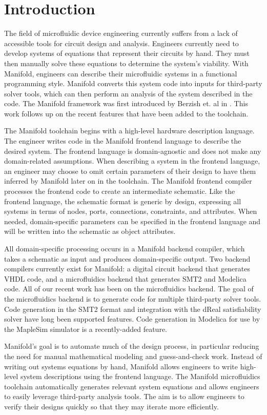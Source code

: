 \section{Introduction}

The field of microfluidic device engineering currently suffers from a lack of accessible tools for circuit design and analysis.
Engineers currently need to develop systems of equations that represent their circuits by hand.\cite{Thorsen02science}
They must then manually solve these equations to determine the system's viability.
With Manifold, engineers can describe their microfluidic systems in a functional programming style. 
Manifold converts this system code into inputs for third-party solver tools, which can then perform an analysis of the system described in the code.
The Manifold framework was first introduced by Berzish et. al in \cite{Berzish16cascon}.
This work follows up on the recent features that have been added to the toolchain.

The Manifold toolchain begins with a high-level hardware description language.
The engineer writes code in the Manifold frontend language to describe the desired system.
The frontend language is domain-agnostic and does not make any domain-related assumptions.
When describing a system in the frontend language, an engineer may choose to omit certain parameters of their design to have them inferred by Manifold later on in the toolchain.
The Manifold frontend compiler processes the frontend code to create an intermediate schematic.
Like the frontend language, the schematic format is generic by design, expressing all systems in terms of nodes, ports, connections, constraints, and attributes.
When needed, domain-specific parameters can be specified in the frontend language and will be written into the schematic as object attributes.

All domain-specific processing occurs in a Manifold backend compiler, which takes a schematic as input and produces domain-specific output.
Two backend compilers currently exist for Manifold: a digital circuit backend that generates VHDL code, and a microfluidics backend that generates SMT2 and Modelica code.
All of our recent work has been on the microfluidics backend.
The goal of the microfluidics backend is to generate code for multiple third-party solver tools.
Code generation in the SMT2 format and integration with the dReal satisfiability solver \cite{Gao13dReal} have long been supported features.
Code generation in Modelica for use by the MapleSim simulator is a recently-added feature.

Manifold's goal is to automate much of the design process, in particular reducing the need for manual mathematical modeling and guess-and-check work.
Instead of writing out systems equations by hand, Manifold allows engineers to write high-level system descriptions using the frontend language.
The Manifold microfluidics toolchain automatically generates relevant system equations and allows engineers to easily leverage third-party analysis tools.
The aim is to allow engineers to verify their designs quickly so that they may iterate more efficiently.
